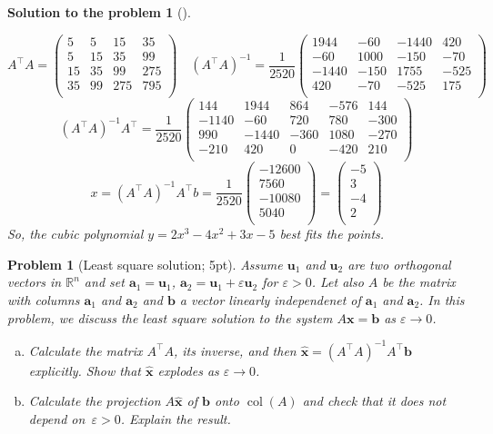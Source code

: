 \documentclass[12pt,a4]{article}
\newtheorem{problem}{Problem}
\newtheorem{solution}{Solution to the problem}
\newcommand{\bR}{{\mathbb R}}
\newcommand{\ba}{{\mathbf a}}
\newcommand{\bb}{{\mathbf b}}
\newcommand{\bu}{{\mathbf u}}
\newcommand{\bx}{{\mathbf x}}
\begin{document}
\begin{solution}[]
\begin{enumerate}[(a)]
\[
A^\top A = 
\begin{pmatrix}
 5 &  5 & 15 &  35 \\
 5 & 15 & 35 &  99 \\
15 & 35 & 99 & 275 \\
35 & 99 &275 & 795 \\
\end{pmatrix} \quad
(A^\top A)^{-1} = \frac{1}{2520}
\begin{pmatrix}
 1944 &  -60 & -1440 &  420 \\
  -60 & 1000 &  -150 &  -70 \\
-1440 & -150 &  1755 & -525 \\
  420 &  -70 &  -525 &  175 \\
\end{pmatrix} \qquad
\]
\[
(A^\top A)^{-1} A^\top =  \frac{1}{2520}
\begin{pmatrix}
 144 &  1944 &  864 & -576 &  144 \\
-1140 & -60 &  720 &  780 & -300 \\
 990 & -1440 & -360 & 1080 & -270 \\
-210 &  420 &    0 & -420 &  210 \\
\end{pmatrix}
\]
\[
x = (A^\top A)^{-1} A^\top b
= \frac{1}{2520}
\begin{pmatrix} 
-12600 \\ 7560 \\ -10080 \\ 5040 \\
\end{pmatrix}
=
\begin{pmatrix} 
-5 \\ 3 \\ -4 \\ 2 \\
\end{pmatrix}
\]
So, the cubic polynomial $y = 2 x^3 - 4x^2 + 3x - 5$ best fits the points.\\
\end{enumerate}
\end{solution}



\begin{problem}[Least square solution; 5pt]
	\rm
	Assume $\bu_1$ and $\bu_2$ are two orthogonal vectors in $\bR^n$ and set $\ba_1 = \bu_1$, $\ba_2 = \bu_1 + \varepsilon \bu_2$ for $\varepsilon>0$. Let also $A$ be the matrix with columns $\ba_1$ and $\ba_2$ and $\bb$ a vector linearly independenet of $\ba_1$ and $\ba_2$. In this problem, we discuss the least square solution to the system $A\bx = \bb$ as $\varepsilon\to0$. 
	\begin{enumerate}[(a)]
		\item Calculate the matrix $A^\top A$, its inverse, and then $\hat\bx = (A^\top A)^{-1}A^\top\bb$ explicitly. Show that $\hat\bx$ explodes as $\varepsilon\to0$.
		\item Calculate the projection $A\hat{\bx}$ of $\bb$ onto $\operatorname{col}(A)$ and check that it does not depend on~$\varepsilon>0$. Explain the result.
	\end{enumerate}
\end{problem}
\end{document}
